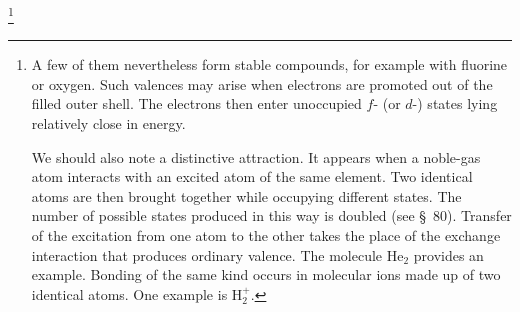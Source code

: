 \footnote{A few of them nevertheless form stable compounds, for example with fluorine or oxygen. Such valences may arise when electrons are promoted out of the filled outer shell. The electrons then enter unoccupied $f$- (or $d$-) states lying relatively close in energy.

We should also note a distinctive attraction. It appears when a noble-gas atom interacts with an excited atom of the same element. Two identical atoms are then brought together while occupying different states. The number of possible states produced in this way is doubled (see \S~80). Transfer of the excitation from one atom to the other takes the place of the exchange interaction that produces ordinary valence. The molecule $\mathrm{He}_2$ provides an example. Bonding of the same kind occurs in molecular ions made up of two identical atoms. One example is $\mathrm H_2^+$.}
